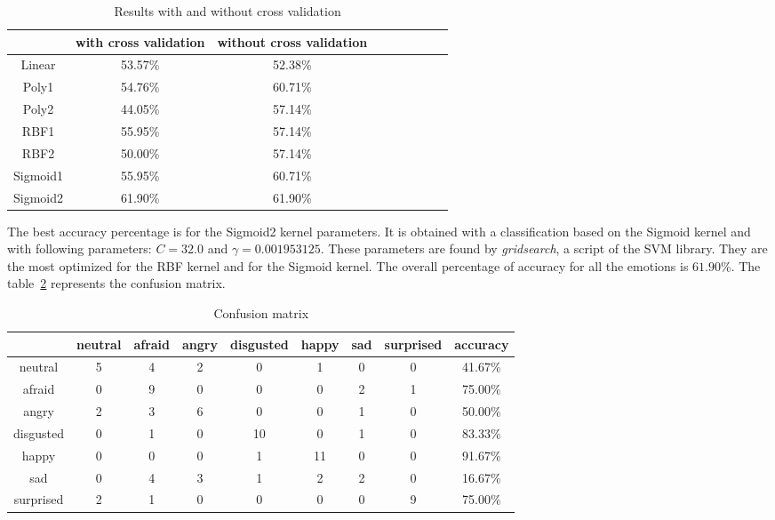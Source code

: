 \begin{table}[h]
   \caption{\label{table_results_crossvalidation} Results with and without cross validation}
\begin{tabular}{|c|c|c|c|c|c|c|c|c|}
  \hline
    & with cross validation & without cross validation \\
  \hline
  Linear & 53.57\% & 52.38\% \\
  Poly1 & 54.76\% & 60.71\% \\
  Poly2 & 44.05\% & 57.14\% \\
  RBF1 & 55.95\% & 57.14\% \\
  RBF2 & 50.00\% & 57.14\% \\
  Sigmoid1 & 55.95\% & 60.71\% \\
  Sigmoid2 & 61.90\% & 61.90\% \\
  \hline
\end{tabular}
\end{table}

\noindent The best accuracy percentage is for the Sigmoid2 kernel parameters. It is obtained with a classification based on the Sigmoid kernel and with following parameters: $ C = 32.0 $ and $ \gamma = 0.001953125 $. These parameters are found by \textit{gridsearch}, a script of the SVM library. They are the most optimized for the RBF kernel and for the Sigmoid kernel. The overall percentage of accuracy for all the emotions is $ 61.90\% $. The table~\ref{table_results_confusion_matrix} represents the confusion matrix.
\newline

\begin{table}[h]
   \caption{\label{table_results_confusion_matrix} Confusion matrix}
\begin{tabular}{|c|c|c|c|c|c|c|c|c|}
  \hline
   & neutral & afraid & angry & disgusted & happy & sad & surprised & accuracy \\
  \hline
  neutral & 5 & 4 & 2 & 0 & 1 & 0 & 0 & 41.67\% \\
  afraid & 0 & 9 & 0 & 0 & 0 & 2 & 1 & 75.00\% \\
  angry & 2 & 3 & 6 & 0 & 0 & 1 & 0 & 50.00\% \\
  disgusted & 0 & 1 & 0 & 10 & 0 & 1 & 0 & 83.33\% \\
  happy & 0 & 0 & 0 & 1 & 11 & 0 & 0 & 91.67\% \\
  sad & 0 & 4 & 3 & 1 & 2 & 2 & 0 & 16.67\% \\
  surprised & 2 & 1 & 0 & 0 & 0 & 0 & 9 & 75.00\%\\
  \hline
\end{tabular}
\end{table}

